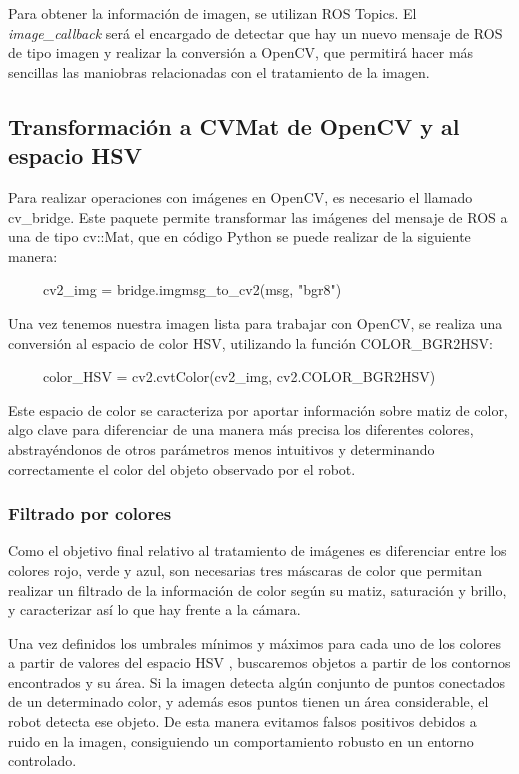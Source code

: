 \documentclass[12pt,spanish,chapterprefix, numbers=noenddot]{book}
\numberwithin{equation}{section}
\numberwithin{figure}{section}
\begin{document}
Para obtener la información de imagen, se utilizan ROS Topics. El \textit{image\_callback} será el encargado de detectar que hay un nuevo mensaje de ROS de tipo imagen y realizar la conversión a OpenCV, que permitirá hacer más sencillas las maniobras relacionadas con el tratamiento de la imagen.

\subsection{Transformación a CVMat de OpenCV y al espacio HSV}

Para realizar operaciones con imágenes en OpenCV, es necesario el llamado cv\_bridge. Este paquete permite transformar las imágenes del mensaje de ROS a una de tipo cv::Mat, que en código Python se puede realizar de la siguiente manera: 
    
\ \ \ \ \ cv2\_img = bridge.imgmsg\_to\_cv2(msg, "bgr8")

Una vez tenemos nuestra imagen lista para trabajar con OpenCV, se realiza una conversión al espacio de color HSV, utilizando la función COLOR\_BGR2HSV:

\ \ \ \ \ color\_HSV = cv2.cvtColor(cv2\_img, cv2.COLOR\_BGR2HSV)

Este espacio de color se caracteriza por aportar información sobre matiz de color, algo clave para diferenciar de una manera más precisa los diferentes colores, abstrayéndonos de otros parámetros menos intuitivos y determinando correctamente el color del objeto observado por el robot. 



\subsubsection{Filtrado por colores}
Como el objetivo final relativo al tratamiento de imágenes es diferenciar entre los colores rojo, verde y azul, son necesarias tres máscaras de color que permitan realizar un filtrado de la información de color según su matiz, saturación y brillo, y caracterizar así lo que hay frente a la cámara. 

Una vez definidos los umbrales mínimos y máximos para cada uno de los colores a partir de valores del espacio HSV \cite{colores} \cite{py_colors}, buscaremos objetos a partir de los contornos encontrados y su área. Si la imagen detecta algún conjunto de puntos conectados de un determinado color, y además esos puntos tienen un área considerable, el robot detecta ese objeto. De esta manera evitamos falsos positivos debidos a ruido en la imagen, consiguiendo un comportamiento robusto en un entorno controlado. 
\end{document}
